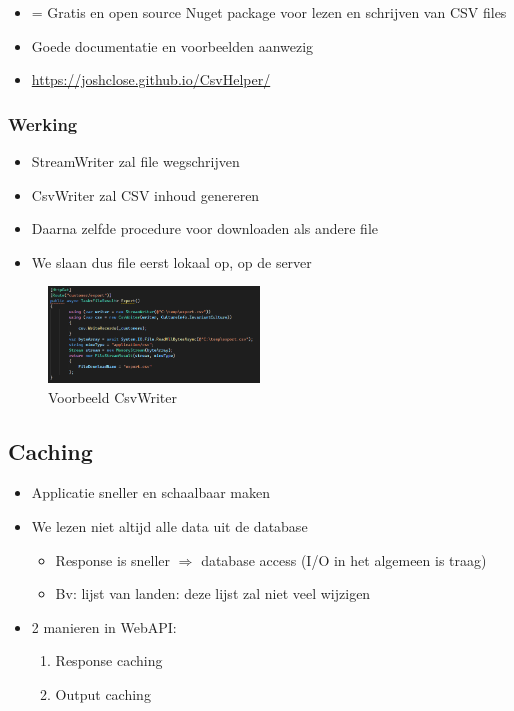 \documentclass{article}
\begin{document}
\begin{itemize}
    \item = Gratis en open source Nuget package voor lezen en schrijven van CSV files
    \item Goede documentatie en voorbeelden aanwezig
    \item \url{https://joshclose.github.io/CsvHelper/}
\end{itemize}

\subsubsection{Werking}

\begin{itemize}
    \item StreamWriter zal file wegschrijven
    \item CsvWriter zal CSV inhoud genereren
    \item Daarna zelfde procedure voor downloaden als andere file
    \item We slaan dus file eerst lokaal op, op de server
\end{itemize}

\begin{figure}[H]
    \centering
    \includegraphics[width=0.5\textwidth]{csv-werking.png}
    \caption{Voorbeeld CsvWriter}
\end{figure}

\subsection{Caching}

\begin{itemize}
    \item Applicatie sneller en schaalbaar maken
    \item We lezen niet altijd alle data uit de database
    \begin{itemize}
        \item Response is sneller $\Rightarrow$ database access (I/O in het algemeen is traag)
        \item Bv: lijst van landen: deze lijst zal niet veel wijzigen
    \end{itemize}
    \item 2 manieren in WebAPI:
    \begin{enumerate}
        \item Response caching
        \item Output caching
    \end{enumerate}
\end{itemize}
\end{document}
